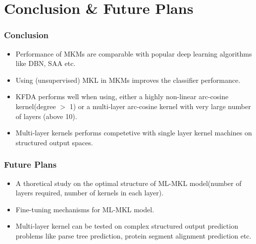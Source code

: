 \documentclass[a4paper,compress,svgnames]{beamer}
\begin{document}
\section{Conclusion \& Future Plans}

\begin{frame}
\frametitle{Conclusion}
\begin{itemize}
\setlength\itemsep{0.4em}
\item Performance of MKMs are comparable with popular deep learning algorithms like DBN, SAA etc.
\item Using (unsupervised) MKL in MKMs improves the classifier performance.
\item KFDA performs well when using, either a highly non-linear arc-cosine kernel(degree $>$ 1) or a
multi-layer arc-cosine kernel with very large number of layers (above 10).
\item Multi-layer kernels performs competetive with single layer kernel machines on structured output spaces.
\end{itemize}
\end{frame}

\begin{frame}
\frametitle{Future Plans}
\begin{itemize}
\setlength\itemsep{1em}
\item A thoretical study on the optimal structure of ML-MKL model(number of layers required, number of kernels in each layer).
\item Fine-tuning mechanisms for ML-MKL model.
\item Multi-layer kernel can be tested on complex structured output prediction problems like parse tree prediction, protein segment alignment prediction etc.
\end{itemize}
\end{frame}
\end{document}
